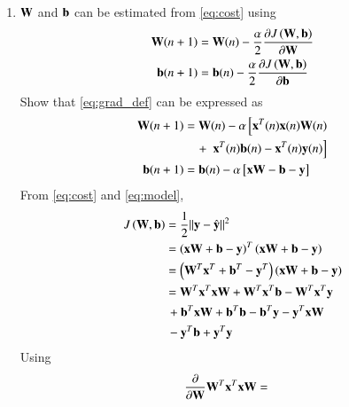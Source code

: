 \documentclass[journal,12pt,twocolumn]{IEEEtran}
\renewcommand\thesection{\arabic{section}}
\renewcommand\thesubsection{\thesection.\arabic{subsection}}
\begin{document}
\begin{enumerate}[label=\thesubsection.\arabic*
,ref=\thesection.\theenumi]
\item $\mathbf{W}$ and $\mathbf{b}$ can be estimated from \eqref{eq:cost} using
\begin{align}
\label{eq:grad_def}
\mathbf{W}(n+1) &= \mathbf{W}(n) - \frac{\alpha}{2}\frac{\partial J\left(\mathbf{W},\mathbf{b}\right) }{\partial\mathbf{W}}
\\
\mathbf{b}(n+1) &= \mathbf{b}(n) - \frac{\alpha}{2}\frac{\partial J\left(\mathbf{W},\mathbf{b}\right)}{\partial\mathbf{b}}
\end{align}
Show that \eqref{eq:grad_def} can be expressed as
\begin{align}
\mathbf{W}(n+1) &= \mathbf{W}(n) - \alpha{}\left[\mathbf{x}^{T}(n)\mathbf{x}(n)\mathbf{W}(n)\right.
\nonumber \\
& \quad +{}\left.\mathbf{x}^{T}(n)\mathbf{b}(n)-\mathbf{x}^T(n)\mathbf{y}(n)\right]
\\
\mathbf{b}(n+1) &= \mathbf{b}(n) - \alpha{}\left[\mathbf{x}\mathbf{W}-\mathbf{b}-\mathbf{y}\right]
\end{align}
\solution From  \eqref{eq:cost} and \eqref{eq:model}, 
\begin{align}
J\left(\mathbf{W},\mathbf{b}\right)  &= \frac{1}{2}\lVert\mathbf{y}-\hat{\mathbf{y}}\rVert^2
\\
&=\left(\mathbf{x}\mathbf{W}+\mathbf{b}-\mathbf{y}\right)^T\left(\mathbf{x}\mathbf{W}+\mathbf{b}-\mathbf{y}\right)
\\
&=\left(\mathbf{W}^T\mathbf{x}^T+\mathbf{b}^T-\mathbf{y}^T\right)\left(\mathbf{x}\mathbf{W}+\mathbf{b}-\mathbf{y}\right)
\\
&=\mathbf{W}^T\mathbf{x}^T\mathbf{x}\mathbf{W}+\mathbf{W}^T\mathbf{x}^T\mathbf{b}-\mathbf{W}^T\mathbf{x}^T\mathbf{y}
\\
&\,+\mathbf{b}^T\mathbf{x}\mathbf{W}+\mathbf{b}^T\mathbf{b}-\mathbf{b}^T\mathbf{y} - \mathbf{y}^T\mathbf{x}\mathbf{W}
\\
& \, -  \mathbf{y}^T\mathbf{b} +  \mathbf{y}^T \mathbf{y}
\label{eq:expand_cost}
\end{align}
Using
\begin{align}
\frac{\partial}{\partial\mathbf{W}}\mathbf{W}^T\mathbf{x}^T\mathbf{x}\mathbf{W}
&= 
\end{align} 
\end{enumerate}
\end{document}
